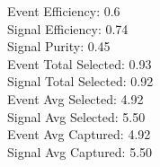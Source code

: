 Event  Efficiency:     0.6\\
Signal Efficiency:     0.74\\
Signal Purity:         0.45\\
Event  Total Selected: 0.93\\
Signal Total Selected: 0.92\\
Event  Avg Selected:   4.92\\
Signal Avg Selected:   5.50\\
Event  Avg Captured:   4.92\\
Signal Avg Captured:   5.50